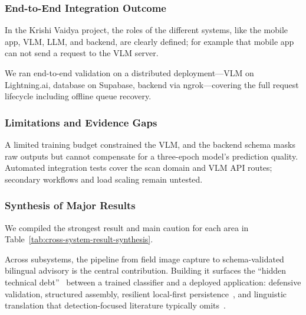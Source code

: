 
\subsubsection{End-to-End Integration Outcome}

In the Krishi Vaidya project, the roles of the different systems, like the mobile app, VLM, LLM, and backend, are clearly defined; for example that mobile app can not send a request to the VLM server. 

We ran end-to-end validation on a distributed deployment---VLM on Lightning.ai, database on
Supabase, backend via ngrok---covering the full request lifecycle including offline queue
recovery.

\subsubsection{Limitations and Evidence Gaps}

A limited training budget constrained the VLM, and the backend schema masks raw outputs but cannot
compensate for a three-epoch model's prediction quality. Automated integration tests cover the
scan domain and VLM API routes; secondary workflows and load scaling remain untested.


\subsubsection{Synthesis of Major Results}

We compiled the strongest result and main caution for each area in
Table~\ref{tab:cross-system-result-synthesis}.

Across subsystems, the pipeline from field image capture to schema-validated bilingual advisory
is the central contribution. Building it surfaces the ``hidden technical
debt''~\parencite{sculleyMLTechDebt2015} between a trained classifier and a deployed
application: defensive validation, structured assembly, resilient local-first
persistence~\parencite{kleppmannLocalFirst2019}, and linguistic translation that
detection-focused literature typically omits~\parencite{liu2021plantDiseaseReview,
wangAgriLLaVA2024}.

